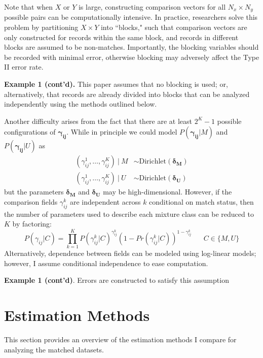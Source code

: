 \documentclass[12pt]{article}
\newcommand\gamij{\mathbf{\gamma_{ij}}}
\begin{document}
Note that when $X$ or $Y$ is large, constructing comparison vectors for all $N_x\times N_y$ possible pairs can be computationally intensive.   In practice, researchers solve this problem by partitioning $X\times Y$ into ``blocks," such that comparison vectors are only constructed for records within the same block, and records in different blocks are assumed to be non-matches. Importantly, the blocking variables should be recorded with minimal error, otherwise blocking may adversely affect the Type II error rate. 

\textbf{Example 1 (cont'd).} This paper assumes that no blocking is used; or, alternatively, that records are already divided into blocks that can be analyzed independently using the methods outlined below.  

Another difficulty arises from the fact that there are at least $2^K -1$ possible configurations of $\gamij$.  While in principle we could model $P(\gamij | M)$ and $P(\gamij | U)$ as
\begin{align*} (\gamma_{ij}^1, \dots, \gamma_{ij}^K) \  |\  M &\sim \text{Dirichlet}(\mathbf{\delta_M})\\
 (\gamma_{ij}^1, \dots, \gamma_{ij}^K) \  |\  U &\sim \text{Dirichlet}(\mathbf{\delta_U}) \end{align*}
but the parameters $\mathbf{\delta_M}$ and $\mathbf{\delta_U}$ may be high-dimensional.  However, if the comparison fields $\gamma_{ij}^{k}$ are independent across $k$ conditional on match status, then the number of parameters used to describe each mixture class can be reduced to $K$ by factoring:
 \begin{equation} 
 P(\gamma_{ij} | C) = \prod_{k=1}^K P(\gamma_{ij}^{k} | C)^{\gamma_{ij}^{k}}(1-Pr(\gamma_{ij}^{k} | C))^{1-\gamma_{ij}^{k}} \hspace{20pt} C\in \{M, U\} 
 \label{eq:condInd}
 \end{equation}
 Alternatively, dependence between fields can be modeled using log-linear models; however, I assume conditional independence to ease computation.  

\textbf{Example 1 (cont'd)}.  Errors are constructed to satisfy this assumption

\section{Estimation Methods}
This section provides an overview of the estimation methods I compare for analyzing the matched datasets. 
\end{document}
